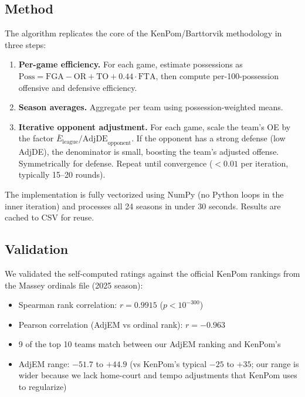 \documentclass[11pt,a4paper]{article}
\begin{document}
\subsection{Method}

The algorithm replicates the core of the KenPom/Barttorvik methodology in three steps:

\begin{enumerate}[nosep]
    \item \textbf{Per-game efficiency.} For each game, estimate possessions as $\text{Poss} = \text{FGA} - \text{OR} + \text{TO} + 0.44 \cdot \text{FTA}$, then compute per-100-possession offensive and defensive efficiency.
    \item \textbf{Season averages.} Aggregate per team using possession-weighted means.
    \item \textbf{Iterative opponent adjustment.} For each game, scale the team's OE by the factor $\bar{E}_{\text{league}} / \text{AdjDE}_{\text{opponent}}$. If the opponent has a strong defense (low AdjDE), the denominator is small, boosting the team's adjusted offense. Symmetrically for defense. Repeat until convergence ($<0.01$ per iteration, typically 15--20 rounds).
\end{enumerate}

The implementation is fully vectorized using NumPy (no Python loops in the inner iteration) and processes all 24 seasons in under 30 seconds. Results are cached to CSV for reuse.

\subsection{Validation}

We validated the self-computed ratings against the official KenPom rankings from the Massey ordinals file (2025 season):

\begin{itemize}[nosep]
    \item Spearman rank correlation: $r = 0.9915$ ($p < 10^{-300}$)
    \item Pearson correlation (AdjEM vs ordinal rank): $r = -0.963$
    \item 9 of the top 10 teams match between our AdjEM ranking and KenPom's
    \item AdjEM range: $-51.7$ to $+44.9$ (vs KenPom's typical $-25$ to $+35$; our range is wider because we lack home-court and tempo adjustments that KenPom uses to regularize)
\end{itemize}
\end{document}
